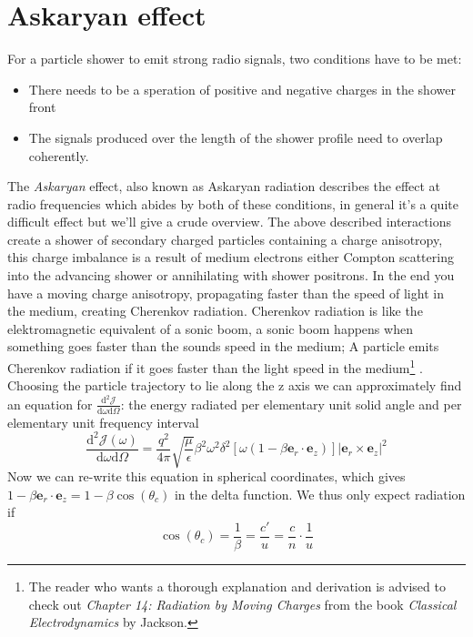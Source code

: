 \documentclass[11pt,a4paper,faculty=we,language=en,doctype=report]{cls/ugent-doc}
\begin{document}
\section{Askaryan effect}
For a particle shower to emit strong radio signals, two conditions have to be met:
\begin{itemize}
	\item There needs to be a speration of positive and negative charges in the shower front 
	\item The signals produced over the length of the shower profile need to overlap coherently.
\end{itemize}
The \textit{Askaryan} \cite{Askaryan} effect, also known as Askaryan
radiation describes the effect at radio frequencies which abides by both 
of these conditions, in general it's a quite difficult effect but we'll give 
a crude overview. 
The above described interactions create a shower
of secondary charged particles containing a charge anisotropy, 
this charge imbalance is a result of medium electrons either Compton
scattering into the advancing shower or annihilating with shower positrons. 
In the end you have a moving charge anisotropy, propagating faster than the speed of 
light in the medium,
creating Cherenkov radiation.
Cherenkov radiation is like the elektromagnetic equivalent of a sonic boom, a
sonic boom happens when something goes faster than the sounds speed in the
medium; A particle emits Cherenkov radiation if it goes faster than the light
speed in the medium\footnote{The reader who wants a thorough explanation and derivation is
advised to check out \textit{Chapter 14: Radiation by Moving Charges} from the
book \textit{Classical Electrodynamics} by Jackson.} 
. Choosing the particle trajectory to lie along the z axis
we can approximately find an equation for $\frac{\text{d}^2 \mathscr{J}}{\text{d}\omega \text{d}\Omega}$: the energy radiated per elementary unit solid angle and per elementary unit frequency interval
\begin{equation}
	\frac{\text{d}^2 \mathscr{J}(\omega)}{\text{d} \omega \text{d} \Omega} = \frac{q^2}{4\pi}\sqrt{\frac{\mu}{\epsilon}}\beta^2\omega^2\delta^2[\omega(1-\beta \mathbf{e}_r\cdot\mathbf{e}_z)]|\mathbf{e}_r\times\mathbf{e}_z|^2 \label{equation: 4.128 in elektromagnetisme}
\end{equation}
Now we can re-write this equation in spherical coordinates, which gives $1-\beta \mathbf{e}_r\cdot\mathbf{e}_z = 1-\beta\cos(\theta_c)$ in the delta function. We thus only expect radiation if
\begin{equation}
\cos(\theta_c) = \frac{1}{\beta} = \frac{c'}{u} = \frac{c}{n}\cdot\frac{1}{u}
\end{equation}
\end{document}
